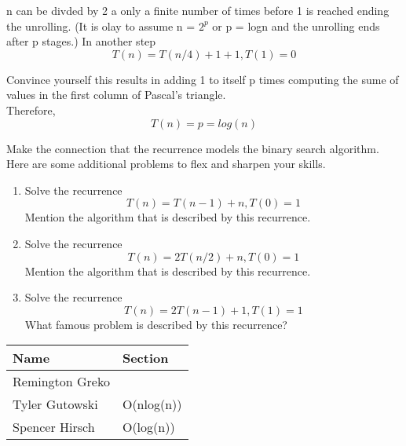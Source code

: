 \documentclass{article}
\begin{document}
\noindent n can be divded by 2 a only a finite number of times before 1 is
reached ending the unrolling. (It is olay to assume n = $2^p$ or p = logn and the
unrolling ends after p stages.) In another step
\[ T(n) = T(n/4) + 1 + 1, T(1) = 0 \]

\noindent Convince yourself this results in adding 1 to itself p times computing
the sume of values in the first column of Pascal's triangle.\\
Therefore,
\[ T(n) = p = log(n) \]

\noindent Make the connection that the recurrence models the binary search algorithm.\\
\noindent Here are some additional problems to flex and sharpen your skills.

\begin{enumerate}
    \item Solve the recurrence
            \[ T(n) = T(n-1) + n, T(0) = 1 \]
            Mention the algorithm that is described by this recurrence.
    \item Solve the recurrence
            \[ T(n) = 2T(n/2) + n, T(0) = 1 \]
            Mention the algorithm that is described by this recurrence.
    \item Solve the recurrence
            \[ T(n) = 2T(n-1) + 1, T(1) = 1 \]
            What famous problem is described by this recurrence?
\end{enumerate}


\pagebreak

\begin{center}
        \begin{tabular}{|p{3cm}|p{6cm}|}
            \hline
            \textbf{Name} & \textbf{Section} \\
            \hline
            Remington Greko & \\
            \hline
            Tyler Gutowski & O(nlog(n)) \\
            \hline
            Spencer Hirsch & O(log(n)) \\
            \hline
        \end{tabular}
    \end{center}
\end{document}
